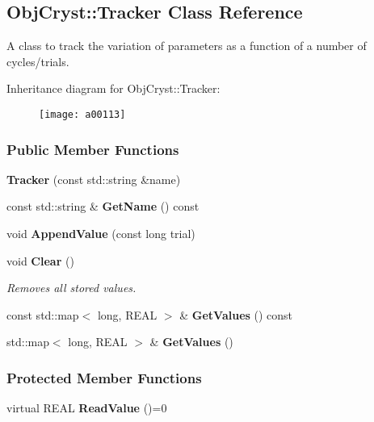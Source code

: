 \subsection{Obj\+Cryst\+:\+:Tracker Class Reference}
\label{a00113}


A class to track the variation of parameters as a function of a number of cycles/trials.  


Inheritance diagram for Obj\+Cryst\+:\+:Tracker\+:\begin{figure}[H]
\begin{center}
\leavevmode
\texttt{[image: a00113]}
\end{center}
\end{figure}
\subsubsection*{Public Member Functions}
\begin{DoxyCompactItemize}
\item 
{\bfseries Tracker} (const std\+::string \&name)\label{a00113_a57d89249ba910902e6ef6a33dcd3ee8c}

\item 
const std\+::string \& {\bfseries Get\+Name} () const \label{a00113_ad93197775f7d0a3b52eb199a9ed1c958}

\item 
void {\bfseries Append\+Value} (const long trial)\label{a00113_ae50d08700a131d280f8a19a58274bfe7}

\item 
void {\bf Clear} ()\label{a00113_abdac1cff42cfd8d66e10977a5a9066b3}

\begin{DoxyCompactList}\small\item\em Removes all stored values. \end{DoxyCompactList}\item 
const std\+::map$<$ long, R\+E\+A\+L $>$ \& {\bfseries Get\+Values} () const \label{a00113_a882fe8d7c193662613d4a9ab262a2417}

\item 
std\+::map$<$ long, R\+E\+A\+L $>$ \& {\bfseries Get\+Values} ()\label{a00113_a4f889b0d29a403c597040c5b88f4ffa8}

\end{DoxyCompactItemize}
\subsubsection*{Protected Member Functions}
\begin{DoxyCompactItemize}
\item 
virtual R\+E\+A\+L {\bfseries Read\+Value} ()=0\label{a00113_a14096d99b76d3ffac16553f6434f97ce}

\end{DoxyCompactItemize}
